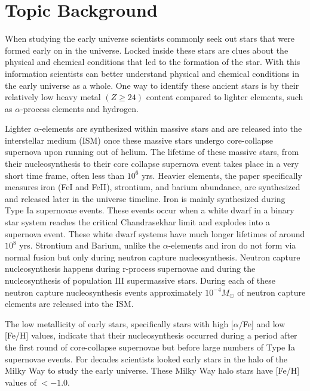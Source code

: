 \documentclass{aastex631}
\begin{document}
\section{Topic Background} \label{sec:background}

When studying the early universe scientists commonly seek out stars that were formed early on in the universe.
Locked inside these stars are clues about the physical and chemical conditions that led to the formation of the star.
With this information scientists can better understand physical and chemical conditions in the early universe as a whole.
One way to identify these ancient stars is by their relatively low heavy metal $\left(Z \geq 24\right)$ content compared to
lighter elements, such as $\alpha$-process elements and hydrogen.

Lighter $\alpha$-elements are synthesized within massive stars and are released into the interstellar medium (ISM) once these
massive stars undergo core-collapse supernova upon running out of helium. The lifetime of these massive stars, from their
nucleosynthesis to their core collapse supernova event takes place in a very short time frame, often less than $10^{6}$ yrs.
Heavier elements, the paper specifically measures iron (FeI and FeII), strontium, and barium abundance, are synthesized
and released later in the universe timeline. Iron is mainly synthesized during Type Ia supernovae events. These events occur
when a white dwarf in a binary star system reaches the critical Chandrasekhar limit and explodes into a supernova event.
These white dwarf systems have much longer lifetimes of around $10^{8}$ yrs.
Strontium and Barium, unlike the $\alpha$-elements and iron do not form via normal fusion but only during neutron capture
nucleosynthesis. Neutron capture nucleosynthesis happens during r-process supernovae and during the nucleosynthesis of
population III supermassive stars. During each of these neutron capture nucleosynthesis events approximately
$10^{-4} M_\odot$ of neutron capture elements are released into the ISM.

The low metallicity of early stars, specifically stars with high [$\alpha$/Fe] and low [Fe/H] values, indicate that their
nucleosynthesis occurred during a period after the first round of core-collapse supernovae but before large numbers of
Type Ia supernovae events. For decades scientists looked early stars in the halo of the Milky Way to study the early universe.
These Milky Way halo stars have [Fe/H] values of $< -1.0$.
\end{document}
